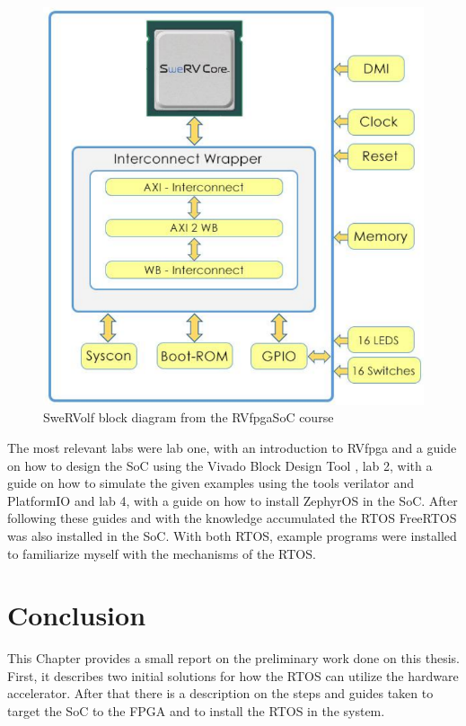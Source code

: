 \begin{figure}[h]
    \centering
    \includegraphics[scale=0.7]{Figures/SweRVolf.png}
    \caption{SweRVolf block diagram from the RVfpgaSoC course}
    \label{fig:SweRVolf}
\end{figure}

The most relevant labs were lab one, with an introduction to RVfpga and a guide on how to design the SoC using the Vivado Block Design Tool \cite{Vivado}, lab 2, with a guide on how to simulate the given examples using the tools verilator \cite{Verilator} and PlatformIO \cite{platformio} and lab 4, with a guide on how to install ZephyrOS in the SoC. After following these guides and with the knowledge accumulated the RTOS FreeRTOS was also installed in the SoC. With both RTOS, example programs were installed to familiarize myself with the mechanisms of the RTOS.



\section{Conclusion}
This Chapter provides a small report on the preliminary work done on this thesis. First, it describes two initial solutions for how the RTOS can utilize the hardware accelerator. After that there is a description on the steps and guides taken to target the SoC to the FPGA and to install the RTOS in the system.


